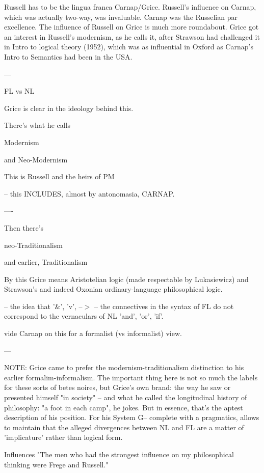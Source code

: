 \documentclass[10pt,titlepage]{book}
\begin{document}
Russell has to be the lingua franca Carnap/Grice. Russell's influence on  
Carnap, which was actually two-way, was invaluable. Carnap was the Russelian 
par  excellence. The influence of Russell on Grice is much more roundabout. 
Grice got  an interest in Russell's modernism, as he calls it, after 
Strawson had  challenged it in Intro to logical theory (1952), which was as 
influential in  Oxford as Carnap's Intro to Semantics had been in the USA.
 
---
 
FL   vs   NL
 
Grice is clear in the ideology behind this.
 
There's what he calls
 
   Modernism
 
and Neo-Modernism
 
This is Russell and the heirs of PM
 
  -- this INCLUDES, almost by antonomasia, CARNAP.
 
----
 
Then there's
 
  neo-Traditionalism
 
  and earlier, Traditionalism
 
  By this Grice means Aristotelian logic (made respectable by  Lukasiewicz)
  and Strawson's and indeed Oxonian ordinary-language philosophical  logic.
 
  -- the idea that '\&', 'v', --$>$ -- the connectives in the  syntax of FL
  do not correspond to the vernaculars of NL 'and', 'or', 'if'.
 
  vide Carnap on this for a formalist (vs informalist) view.
 
 
 
--- 

NOTE: Grice came to prefer the modernism-traditionalism  distinction to his 
earlier formalim-informalism. The important thing here is not  so much the 
labels for these sorts of betes noires, but Grice's own brand: the  way he 
saw or presented himself "in society" -- and what he called the  longitudinal 
history of philosophy: "a foot in each camp", he jokes. But in  essence, 
that's the aptest description of his position. For his System G--  complete 
with a pragmatics, allows to maintain that the alleged divergences  between 
NL and FL are a matter of 'implicature' rather than logical form. 
 
Influences
"The men who had the strongest influence on my philosophical  thinking were 
Frege and Russell." 
 
\end{document}
